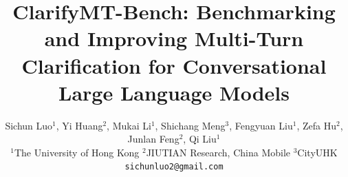 \documentclass[sigconf]{acmart}
\title{ClarifyMT-Bench: Benchmarking and Improving Multi-Turn Clarification for Conversational Large Language Models}
\author{Sichun Luo$^1$, Yi Huang$^2$, Mukai Li$^1$, Shichang Meng$^3$, Fengyuan Liu$^1$, Zefa Hu$^2$, Junlan Feng$^2$, Qi Liu$^1$\\
$^1$The University of Hong Kong \quad $^2$JIUTIAN Research, China Mobile \quad $^3$CityUHK\\
\texttt{sichunluo2@gmail.com}\\ $ $
}
\newcommand{\dataset}{ClarifyMT-Bench\xspace}
\newcommand{\model}{ClarifyAgent\xspace}
\begin{document}
\begin{abstract}




\end{abstract}
\end{document}
